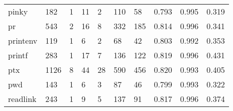\begin{longtable}{lp{1.3cm}p{1.3cm}p{1.3cm}p{1.3cm}p{1.3cm}p{1.3cm}p{1.3cm}p{1.3cm}p{1.3cm}}
pinky     &                    182 &                                  1 &                                11 &                                2 &                               110 &                              58 &                                   0.793 &                                  0.995 &                                0.319 \\
pr        &                    543 &                                  2 &                                16 &                                8 &                               332 &                             185 &                                   0.814 &                                  0.996 &                                0.341 \\
printenv  &                    119 &                                  1 &                                 6 &                                2 &                                68 &                              42 &                                   0.803 &                                  0.992 &                                0.353 \\
printf    &                    283 &                                  1 &                                17 &                                7 &                               136 &                             122 &                                   0.819 &                                  0.996 &                                0.431 \\
ptx       &                   1126 &                                  8 &                                44 &                               28 &                               590 &                             456 &                                   0.820 &                                  0.993 &                                0.405 \\
pwd       &                    143 &                                  1 &                                 6 &                                3 &                                87 &                              46 &                                   0.799 &                                  0.993 &                                0.322 \\
readlink  &                    243 &                                  1 &                                 9 &                                5 &                               137 &                              91 &                                   0.817 &                                  0.996 &                                0.374 \\

\end{longtable}
